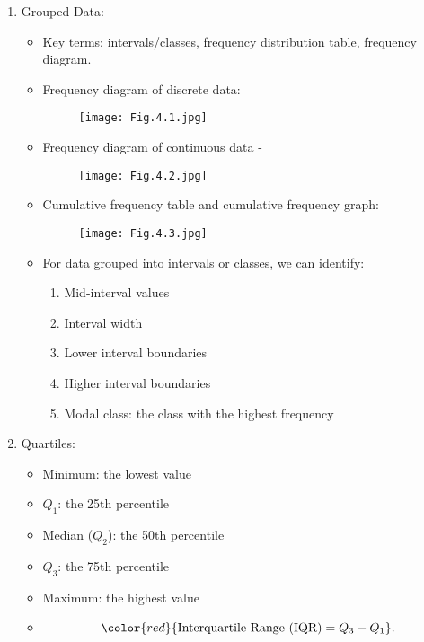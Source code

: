 \documentclass[12pt, a4paper]{article}
\begin{document}
\begin{enumerate}
    \item Grouped Data: 
    \begin{itemize}
        \item Key terms: intervals/classes, frequency distribution table, frequency diagram. 
        \item Frequency diagram of discrete data: 
        \begin{figure}[H]
            \center
            \texttt{[image: Fig.4.1.jpg]}
        \end{figure}
        \item Frequency diagram of continuous data - \textbf{\color{red}{Histogram}}
        \begin{figure}[H]
            \center
            \texttt{[image: Fig.4.2.jpg]}
        \end{figure}
        \item Cumulative frequency table and cumulative frequency graph: 
        \begin{figure}[H]
            \center
            \texttt{[image: Fig.4.3.jpg]}
        \end{figure}
        \item For data grouped into intervals or classes, we can identify: 
        \begin{enumerate}
            \item Mid-interval values
            \item Interval width
            \item Lower interval boundaries
            \item Higher interval boundaries
            \item Modal class: the class with the highest frequency
        \end{enumerate}
    \end{itemize}
    \item Quartiles: 
    \begin{itemize}
        \item Minimum: the lowest value
        \item $Q_1$: the 25th percentile
        \item Median ($Q_2$): the 50th percentile
        \item $Q_3$: the 75th percentile
        \item Maximum: the highest value
        \item $${\color{red}{\text{Interquartile Range (IQR)}=Q_3-Q_1}}.$$ 

\end{itemize}
\end{enumerate}
\end{document}
